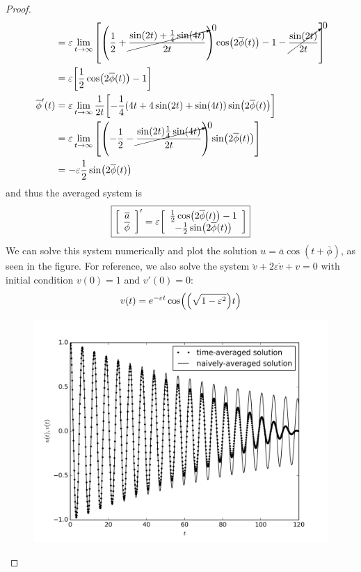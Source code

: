 \documentclass{article} %
\theoremstyle{plain}
\newcommand{\E}{\varepsilon}
\numberwithin{equation}{section} %
\numberwithin{figure}{section} %
\numberwithin{table}{section} %
\begin{document}
\begin{proof}
\begin{align*}
        &= \E\lim_{t\rightarrow \infty}\qty[\qty(\frac{1}{2} + \cancelto{0}{\frac{\sin(2t) + \frac{1}{4}\sin(4t)}{2t}})\cos(2\overline{\phi}(t)) - 1 - \cancelto{0}{\frac{\sin(2t)}{2t}}] \\
        &= \E\qty[\frac{1}{2}\cos(2\overline{\phi}(t)) - 1] \\
        \overline{\phi}'(t) &= \E\lim_{t\rightarrow \infty} \frac{1}{2t}\qty[-\frac{1}{4}\qty(4t + 4\sin(2t) + \sin(4t))\sin(2\overline{\phi}(t))] \\
        &= \E\lim_{t\rightarrow\infty}\qty[\qty(-\frac{1}{2} - \cancelto{0}{\frac{\sin(2t)\frac{1}{4}\sin(4t)}{2t}})\sin(2\overline{\phi}(t))] \\
        &= -\E\frac{1}{2}\sin(2\overline{\phi}(t))
    \end{align*}
    and thus the averaged system is
    \begin{align*}
        \boxed{\qty[\begin{array}{c}\overline{a} \\ \overline{\phi}\end{array}]' = \E\qty[\begin{array}{c}\frac{1}{2}\cos(2\overline{\phi}(t)) - 1 \\ -\frac{1}{2}\sin(2\overline{\phi}(t))\end{array}]}
    \end{align*}
    We can solve this system numerically and plot the solution $u = \overline{a}\cos(t + \overline{\phi})$, as seen in the figure.  For reference, we also solve the system $\ddot{v} + 2\E\dot{v} + v = 0$ with initial condition $v(0) = 1$ and $v'(0) = 0$:
    \begin{align*}
        v(t) = e^{-\E t}\cos(\qty(\sqrt{1 - \E^2})t)
    \end{align*}

    \begin{figure}[ht!]
        \centering
        \includegraphics[width=\textwidth]{problem_2.png}
    \end{figure}
\end{proof}
\end{document}
